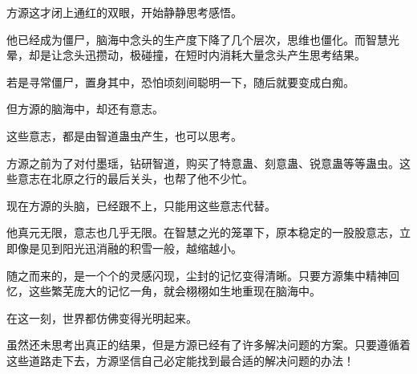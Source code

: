 \begin{this_body}
方源这才闭上通红的双眼，开始静静思考感悟。

他已经成为僵尸，脑海中念头的生产度下降了几个层次，思维也僵化。而智慧光晕，却是让念头迅攒动，极碰撞，在短时内消耗大量念头产生思考结果。

若是寻常僵尸，置身其中，恐怕顷刻间聪明一下，随后就要变成白痴。

但方源的脑海中，却还有意志。

这些意志，都是由智道蛊虫产生，也可以思考。

方源之前为了对付墨瑶，钻研智道，购买了特意蛊、刻意蛊、锐意蛊等等蛊虫。这些意志在北原之行的最后关头，也帮了他不少忙。

现在方源的头脑，已经跟不上，只能用这些意志代替。

他真元无限，意志也几乎无限。在智慧之光的笼罩下，原本稳定的一股股意志，立即像是见到阳光迅消融的积雪一般，越缩越小。

随之而来的，是一个个的灵感闪现，尘封的记忆变得清晰。只要方源集中精神回忆，这些繁芜庞大的记忆一角，就会栩栩如生地重现在脑海中。

在这一刻，世界都仿佛变得光明起来。

虽然还未思考出真正的结果，但是方源已经有了许多解决问题的方案。只要遵循着这些道路走下去，方源坚信自己必定能找到最合适的解决问题的办法！

\end{this_body}

